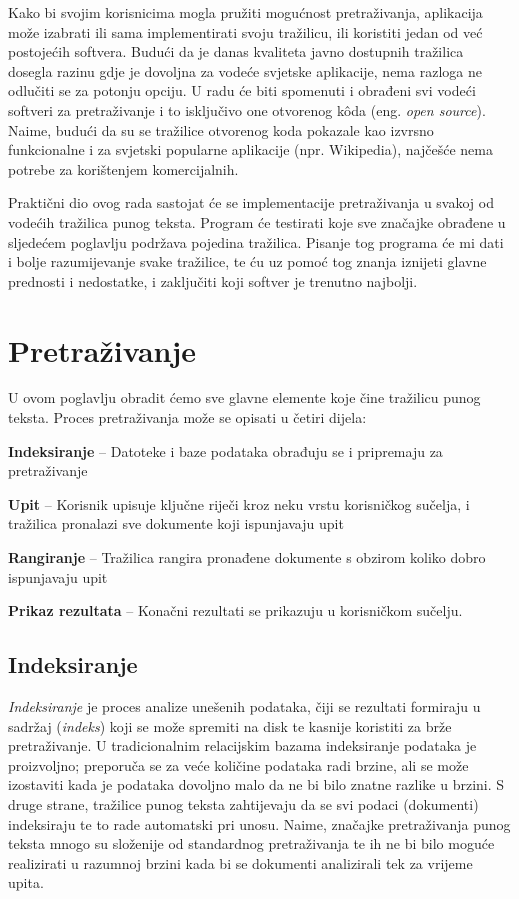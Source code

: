 \documentclass[a4paper,twoside,12pt]{scrreprt}
\begin{document}
Kako bi svojim korisnicima mogla pružiti mogućnost pretraživanja, aplikacija može izabrati ili sama implementirati svoju tražilicu, ili koristiti jedan od već postojećih softvera. Budući da je danas kvaliteta javno dostupnih tražilica dosegla razinu gdje je dovoljna za vodeće svjetske aplikacije, nema razloga ne odlučiti se za potonju opciju. U radu će biti spomenuti i obrađeni svi vodeći softveri za pretraživanje i to isključivo one otvorenog kôda (eng. \textit{open source}). Naime, budući da su se tražilice otvorenog koda pokazale kao izvrsno funkcionalne i za svjetski popularne aplikacije (npr. Wikipedia), najčešće nema potrebe za korištenjem komercijalnih.

Praktični dio ovog rada sastojat će se implementacije pretraživanja u svakoj od vodećih tražilica punog teksta. Program će testirati koje sve značajke obrađene u sljedećem poglavlju podržava pojedina tražilica. Pisanje tog programa će mi dati i bolje razumijevanje svake tražilice, te ću uz pomoć tog znanja iznijeti glavne prednosti i nedostatke, i zaključiti koji softver je trenutno najbolji.

\chapter{Pretraživanje} \label{searching}

U ovom poglavlju obradit ćemo sve glavne elemente koje čine tražilicu punog teksta. Proces pretraživanja može se opisati u četiri dijela:

\begin{compactenum}
  \item \textbf{Indeksiranje} – Datoteke i baze podataka obrađuju se i pripremaju za pretraživanje
  \item \textbf{Upit} – Korisnik upisuje ključne riječi kroz neku vrstu korisničkog sučelja, i tražilica pronalazi sve dokumente koji ispunjavaju upit
  \item \textbf{Rangiranje} – Tražilica rangira pronađene dokumente s obzirom koliko dobro ispunjavaju upit
  \item \textbf{Prikaz rezultata} – Konačni rezultati se prikazuju u korisničkom sučelju.
\end{compactenum}

\section{Indeksiranje}
\label{indexing}

\textit{Indeksiranje} je proces analize unešenih podataka, čiji se rezultati formiraju u sadržaj (\textit{indeks}) koji se može spremiti na disk te kasnije koristiti za brže pretraživanje. U tradicionalnim relacijskim bazama indeksiranje podataka je proizvoljno; preporuča se za veće količine podataka radi brzine, ali se može izostaviti kada je podataka dovoljno malo da ne bi bilo znatne razlike u brzini. S druge strane, tražilice punog teksta zahtijevaju da se svi podaci (dokumenti) indeksiraju te to rade automatski pri unosu. Naime, značajke pretraživanja punog teksta mnogo su složenije od standardnog pretraživanja te ih ne bi bilo moguće realizirati u razumnoj brzini kada bi se dokumenti analizirali tek za vrijeme upita.
\end{document}
